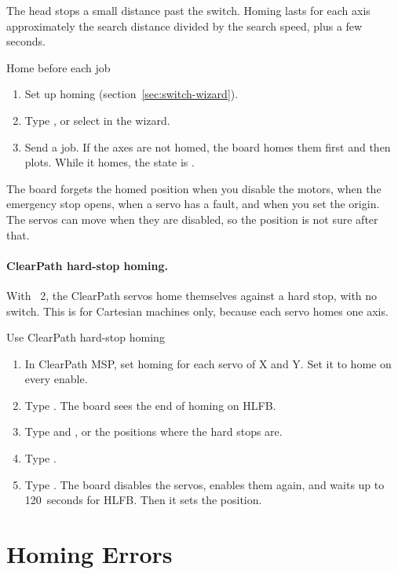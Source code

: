 The head stops a small distance past the switch. Homing lasts for each axis
approximately the search distance divided by the search speed, plus a few
seconds.

\begin{procedure}{Home before each job}
\begin{enumerate}
  \item Set up homing (section~\ref{sec:switch-wizard}).
  \item Type , or select  in the wizard.
  \item Send a job. If the axes are not homed, the board homes them first and
        then plots. While it homes, the state is .
\end{enumerate}
\end{procedure}

The board forgets the homed position when you disable the motors, when the
emergency stop opens, when a servo has a fault, and when you set the origin.
The servos can move when they are disabled, so the position is not sure after
that.

\paragraph{ClearPath hard-stop homing.} With ~2, the ClearPath
servos home themselves against a hard stop, with no switch. This is for
Cartesian machines only, because each servo homes one axis.

\begin{procedure}{Use ClearPath hard-stop homing}
\begin{enumerate}
  \item In ClearPath MSP, set homing for each servo of X and Y. Set it to home
        on every enable.
  \item Type . The board sees the end of homing on HLFB.
  \item Type  and , or the positions
        where the hard stops are.
  \item Type .
  \item Type . The board disables the servos, enables them again,
        and waits up to 120~seconds for HLFB. Then it sets the position.
\end{enumerate}
\end{procedure}

\section{Homing Errors}

